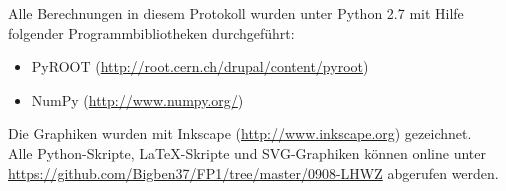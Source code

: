 \documentclass[12pt, a4paper]{scrartcl}
\title{\exptitle}
\subtitle{Fortgeschrittenen-Praktikum 1}
\author{Moritz Bitterling und Benjamin Rottler \\ Universität Freiburg}
\date{\expdate}
\numberwithin{equation}{section} %
\numberwithin{table}{section}    %
\begin{document}
\hypersetup{pageanchor=false} %

\thispagestyle{empty}

\newpage
Alle Berechnungen in diesem Protokoll wurden unter Python 2.7 mit Hilfe folgender Programmbibliotheken durchgeführt:
\begin{itemize}
  \item PyROOT (\url{http://root.cern.ch/drupal/content/pyroot})
  \item NumPy (\url{http://www.numpy.org/})
\end{itemize}
Die Graphiken wurden mit Inkscape (\url{http://www.inkscape.org}) gezeichnet.\\[\baselineskip]
Alle Python-Skripte, \LaTeX-Skripte und SVG-Graphiken können online unter \\
\url{https://github.com/Bigben37/FP1/tree/master/0908-LHWZ} abgerufen werden.
\thispagestyle{empty}

\newpage
\tableofcontents
\thispagestyle{empty}

\newpage
\hypersetup{pageanchor=true} %
\setcounter{page}{1} %

 





%
\end{document}

